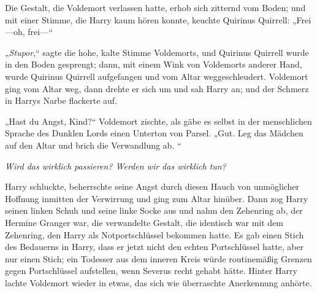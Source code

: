 Die Gestalt, die Voldemort verlassen hatte, erhob sich zitternd vom Boden; und mit einer Stimme, die Harry kaum hören konnte, keuchte Quirinus Quirrell: „Frei—oh, frei—“

„\emph{Stupor},“ sagte die hohe, kalte Stimme Voldemorts, und Quirinus Quirrell wurde in den Boden gesprengt; dann, mit einem Wink von Voldemorts anderer Hand, wurde Quirinus Quirrell aufgefangen und vom Altar weggeschleudert.
Voldemort ging vom Altar weg, dann drehte er sich um und sah Harry an; und der Schmerz in Harrys Narbe flackerte auf.

„Hast du Angst, Kind?“ Voldemort zischte, als gäbe es selbst in der menschlichen Sprache des Dunklen Lords einen Unterton von Parsel.
„Gut. Leg das Mädchen auf den Altar und brich die Verwandlung ab. “

\emph{Wird das wirklich passieren? Werden wir das wirklich tun?}

Harry schluckte, beherrschte seine Angst durch diesen Hauch von unmöglicher Hoffnung inmitten der Verwirrung und ging zum Altar hinüber. Dann zog Harry seinen linken Schuh und seine linke Socke aus und nahm den Zehenring ab, der Hermine Granger war, die verwandelte Gestalt, die identisch war mit dem Zehenring, den Harry als Notportschlüssel bekommen hatte. Es gab einen Stich des Bedauerns in Harry, dass er jetzt nicht den echten Portschlüssel hatte, aber nur einen Stich; ein Todesser aus dem inneren Kreis würde routinemäßig Grenzen gegen Portschlüssel aufstellen, wenn Severus recht gehabt hätte.
Hinter Harry lachte Voldemort wieder in etwas, das sich wie überraschte Anerkennung anhörte.

